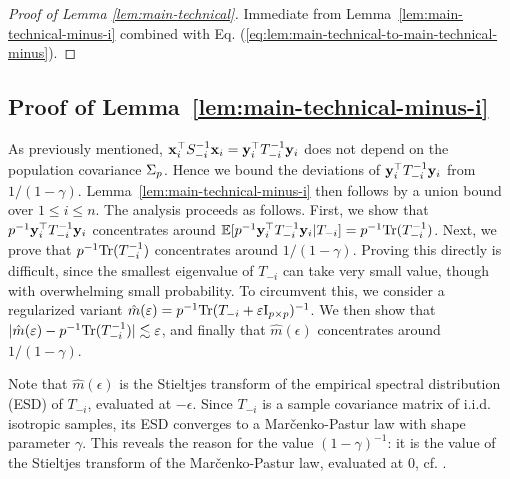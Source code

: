 \documentclass[times,sort&compress,3p]{elsarticle}
\begin{document}
\begin{proof}[ Proof of Lemma \ref{lem:main-technical}]
Immediate from Lemma~\ref{lem:main-technical-minus-i} combined with Eq. (\ref{eq:lem:main-technical-to-main-technical-minus}).
 \end{proof}


\subsection{Proof of Lemma~\ref{lem:main-technical-minus-i}}
\label{appendix:proof-unregularized-main-lemma}

As previously mentioned, ${\bf x}_i^\top S^{-1}_{-i}{\bf x}_i = {\bf y}_i^\top T^{-1}_{-i}{\bf y}_i$
does not depend on the population covariance $\Sigma_p$. 
Hence we bound the deviations 
of ${\bf y}_i^\top T_{-i}^{-1}
{\bf y}_i$ from $1/(1-\gamma)$.
Lemma~\ref{lem:main-technical-minus-i} then follows by a union bound over $1\le i \le n$. 
The analysis proceeds as follows. First,  
we show that $p^{-1} {\bf y}_i^\top T_{-i}^{-1}{\bf y}_i$ concentrates around ${\mathbb{E}}[p^{-1}{\bf y}_i^\top T_{-i}^{-1}{\bf y}_i|T_{-i}] = p^{-1}\textrm{Tr}(T_{-i}^{-1})$.
Next, we prove that $p^{-1}\textrm{Tr}(T_{-i}^{-1})$
concentrates around $1/(1-\gamma)$. 
Proving this directly is difficult, since
the smallest eigenvalue of $T_{-i}$ can take very small value, though with overwhelming small probability. To circumvent this, we consider a regularized variant $\hat{m}(\varepsilon)=p^{-1}\textrm{Tr}(T_{-i}+\varepsilon\mathrm{I}_{p \times p})^{-1}$.
        We then show that $|\hat{m}(\varepsilon)-p^{-1}\textrm{Tr}(T_{-i}^{-1})|\lesssim \varepsilon$,
        and finally
        that $\hat{m}(\epsilon)$ concentrates around $1/(1-\gamma)$.
        
        
        
Note that  $\hat m(\epsilon)$ is the Stieltjes transform of the empirical spectral distribution (ESD) of $T_{-i}$, evaluated at $-\epsilon$. Since $T_{-i}$ is a sample covariance matrix of i.i.d. isotropic samples, its ESD converges to a Mar\v{c}enko-Pastur law with shape parameter $\gamma$. This reveals the reason for the value $(1-\gamma)^{-1}$: it is the value of the Stieltjes transform of the Mar\v{c}enko-Pastur law, evaluated at $0$, cf. \cite{bai2010spectral,couillet2014robust}. 
\end{document}
